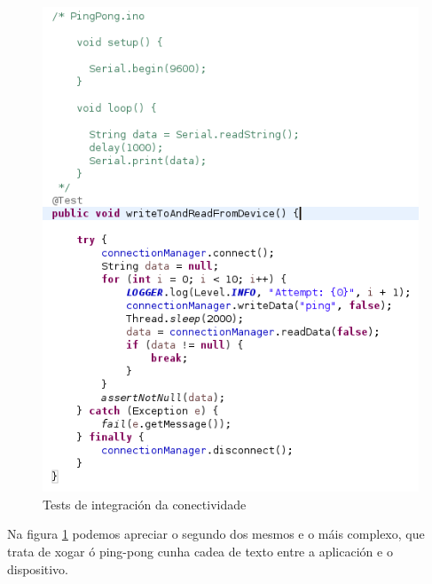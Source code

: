  \begin{figure}[htbp]
  \centering
  \includegraphics[scale=0.8,keepaspectratio=true]{./imagenes/test-integracion-conectividade.png}
  \caption{Tests de integración da conectividade}
  \label{figura:TestIntegracionConectividade}
 \end{figure}
 
 Na figura \ref{figura:TestIntegracionConectividade} podemos apreciar o segundo
 dos mesmos e o máis complexo, que trata de xogar ó ping-pong cunha cadea de
 texto entre a aplicación e o dispositivo. \\
 

